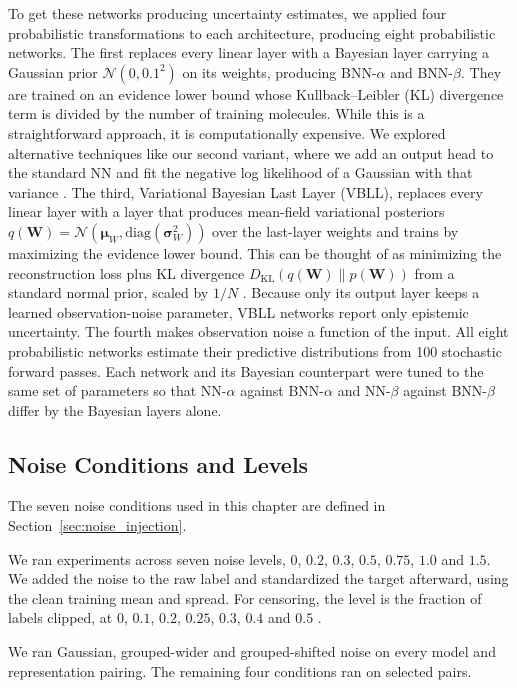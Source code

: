 To get these networks producing uncertainty estimates, we applied four probabilistic transformations to each architecture, producing eight probabilistic networks. The first replaces every linear layer with a Bayesian layer carrying a Gaussian prior $\mathcal{N}(0, 0.1^2)$ on its weights, producing BNN-$\alpha$ and BNN-$\beta$. They are trained on an evidence lower bound whose  Kullback–Leibler (KL) divergence term is divided by the number of training molecules. While this is a straightforward approach, it is computationally expensive. We explored alternative techniques like our second variant, where we add an output head to the standard NN and fit the negative log likelihood of a Gaussian with that variance \citep{kendall2017}. The third, Variational Bayesian Last Layer (VBLL), replaces every linear layer with a layer that produces mean-field variational posteriors $q(\mathbf{W}) = \mathcal{N}(\boldsymbol{\mu}_W, \text{diag}(\boldsymbol{\sigma}_W^2))$ over the last-layer weights and trains by maximizing the evidence lower bound. This can be thought of as minimizing the reconstruction loss plus KL divergence $D_{\text{KL}}(q(\mathbf{W}) \| p(\mathbf{W}))$ from a standard normal prior, scaled by $1/N$ \citep{Harrison2024}. Because only its output layer keeps a learned observation-noise parameter, VBLL networks report only epistemic uncertainty. The fourth makes observation noise a function of the input. All eight probabilistic networks estimate their predictive distributions from 100 stochastic forward passes. Each network and its Bayesian counterpart were tuned to the same set of parameters so that NN-$\alpha$ against BNN-$\alpha$ and NN-$\beta$ against BNN-$\beta$ differ by the Bayesian layers alone.

\subsection{Noise Conditions and Levels}
The seven noise conditions used in this chapter are defined in Section~\ref{sec:noise_injection}.

We ran experiments across seven noise levels, $0$, $0.2$, $0.3$, $0.5$, $0.75$, $1.0$ and $1.5$. We added the noise to the raw label and standardized the target afterward, using the clean training mean and spread. For censoring, the level is the fraction of labels clipped, at $0$, $0.1$, $0.2$, $0.25$, $0.3$, $0.4$ and $0.5$ \citep{Svensson2025}.

We ran Gaussian, grouped-wider and grouped-shifted noise on every model and representation pairing. The
remaining four conditions ran on selected pairs. 


